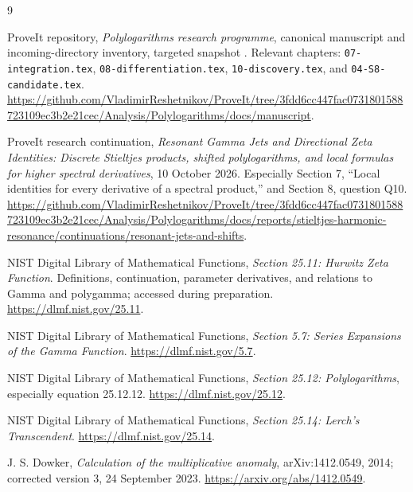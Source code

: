 \begin{thebibliography}{9}
\raggedright
{}
ProveIt repository, \emph{Polylogarithms research programme},
canonical manuscript and incoming-directory inventory, targeted snapshot
\pin. Relevant chapters: \texttt{07-integration.tex},
\texttt{08-differentiation.tex}, \texttt{10-discovery.tex}, and
\texttt{04-S8-candidate.tex}.
\url{https://github.com/VladimirReshetnikov/ProveIt/tree/3fdd6cc447fac0731801588723109ec3b2e21cec/Analysis/Polylogarithms/docs/manuscript}.

ProveIt research continuation, \emph{Resonant Gamma Jets and Directional
Zeta Identities: Discrete Stieltjes products, shifted polylogarithms, and
local formulas for higher spectral derivatives}, 10 October 2026.
Especially Section 7, ``Local identities for every derivative of a
spectral product,'' and Section 8, question Q10.
\url{https://github.com/VladimirReshetnikov/ProveIt/tree/3fdd6cc447fac0731801588723109ec3b2e21cec/Analysis/Polylogarithms/docs/reports/stieltjes-harmonic-resonance/continuations/resonant-jets-and-shifts}.

NIST Digital Library of Mathematical Functions,
\emph{Section 25.11: Hurwitz Zeta Function}.
Definitions, continuation, parameter derivatives, and relations to Gamma
and polygamma; accessed during preparation.
\url{https://dlmf.nist.gov/25.11}.

NIST Digital Library of Mathematical Functions,
\emph{Section 5.7: Series Expansions of the Gamma Function}.
\url{https://dlmf.nist.gov/5.7}.

NIST Digital Library of Mathematical Functions,
\emph{Section 25.12: Polylogarithms}, especially equation 25.12.12.
\url{https://dlmf.nist.gov/25.12}.

NIST Digital Library of Mathematical Functions,
\emph{Section 25.14: Lerch's Transcendent}.
\url{https://dlmf.nist.gov/25.14}.

J. S. Dowker, \emph{Calculation of the multiplicative anomaly},
arXiv:1412.0549, 2014; corrected version 3, 24 September 2023.
\url{https://arxiv.org/abs/1412.0549}.
\end{thebibliography}
